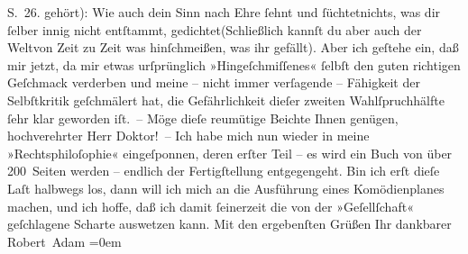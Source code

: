 \begin{ledgroupsized}[t]{13cm}
{{{                     S. 26.}}}\label{K_L02215-1h} gehört):\pend
           \stanza{}{\pb}Wie auch dein Sinn nach Ehre
                     ſehnt und ſüchtet\newverse{}nichts, was dir ſelber innig
                     nicht entſtammt, gedichtet\newverse{}(Schließlich kannſt du aber auch
                     der Welt\newverse{}von Zeit zu Zeit was
                     hinſchmeißen, was ihr gefällt).\stanzaend{}\pstart
           Aber ich geſtehe ein, daß mir jetzt, da mir etwas urſprünglich »Hingeſchmiſſenes«
               ſelbſt den guten richtigen Geſchmack verderben und meine – nicht immer verſagende –
               Fähigkeit der Selbſtkritik geſchmälert hat, die Gefährlichkeit dieſer zweiten
               Wahlſpruchhälfte ſehr klar geworden iſt. –\pend
           \pstart
           Möge dieſe reumütige Beichte Ihnen genügen, hochverehrter Herr Doktor! –\pend
           \pstart
           Ich habe mich nun wieder in meine »Rechtsphiloſophie« eingeſponnen, deren erſter Teil – es wird ein Buch von
               über 200 Seiten werden – endlich der Fertigſtellung entgegengeht. Bin ich erſt dieſe
               Laſt halbwegs los, dann will ich mich an die Ausführung eines Komödienplanes machen,
               und ich hoffe, daß ich damit ſeinerzeit die von der »Geſellſchaft« geſchlagene Scharte auswetzen kann.\pend
           \pstart
           Mit den ergebenſten Grüßen Ihr\pend
           \pstart
           dankbarer{\\[\baselineskip]}\spacefill\mbox{Robert Adam}\pend
           \leftskip=0em{}
         
         \endnumbering{}\end{ledgroupsized}  \newcommand{\dateiname}{L02215}\newcommand{\titel}{Robert Adam an Arthur Schnitzler, 16. 7. 1915}\newcommand{\editorInnen}{Martin Anton Müller und Gerd-Hermann Susen}
      